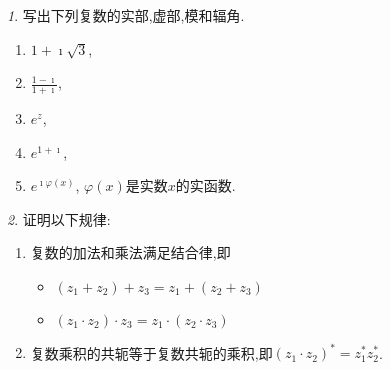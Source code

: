 \documentclass[11pt]{article}
\theoremstyle{remark}
\newtheorem{problem}{}
\begin{document}
\renewcommand{\labelenumi}{(\arabic{enumi})}
\renewcommand{\labelenumii}{(\arabic{enumi}.\arabic{enumii})}



 


\begin{problem}
  写出下列复数的实部,虚部,模和辐角.
  \begin{enumerate}
    \item $1 + \imath \sqrt{3}$,
    \item $\frac{1-\imath}{1+\imath}$,
    \item $e^{z}$,
    \item $e^{1+\imath}$,
    \item $e^{\imath \varphi(x)}$, $\varphi(x)$是实数$x$的实函数.
  \end{enumerate}
  \end{problem}

\begin{problem}
  证明以下规律:
  \begin{enumerate}
    \item 复数的加法和乘法满足结合律,即 
    \begin{itemize}
      \item $(z_1 + z_2 ) + z_3 = z_1 +( z_2 + z_3)$
      \item $(z_1 \cdot z_2) \cdot z_3 = z_1 \cdot (z_2 \cdot z_3)$
    \end{itemize}

    \item 复数乘积的共轭等于复数共轭的乘积,即$(z_1 \cdot z_2)^* = z_1^* z_2^*$.
  \end{enumerate}  
\end{problem}
\end{document}
